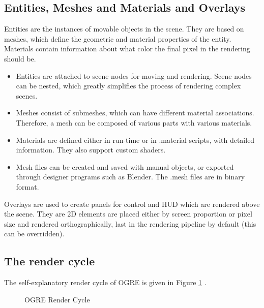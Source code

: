 \subsection{Entities, Meshes and Materials and Overlays}
Entities are the instances of movable objects in the scene. They are based on meshes, which define the geometric and material properties of the entity. Materials contain information about what color the final pixel in the rendering should be. 
\begin{itemize}
\item Entities are attached to scene nodes for moving and rendering. Scene nodes can be nested, which greatly simplifies the process of rendering complex scenes.
\item Meshes consist of submeshes, which can have different material associations. Therefore, a mesh can be composed of various parts with various materials.
\item Materials are defined either in run-time or in .material scripts, with detailed information. They also support custom shaders.
\item Mesh files can be created and saved with manual objects, or exported through designer programs such as Blender. The .mesh files are in binary format.
\end{itemize}
Overlays are used to create panels for control and HUD which are rendered above the scene. They are 2D elements are placed either by screen proportion or pixel size and rendered orthographically, last in the rendering pipeline by default (this can be overridden).

\subsection{The render cycle}
The self-explanatory render cycle of OGRE is given in Figure \ref{fig:ogre-render-cycle} \cite{Moan2012}.

\begin{figure}[h]
\centerline{}
\caption{OGRE Render Cycle}
\label{fig:ogre-render-cycle}
\end{figure}
 